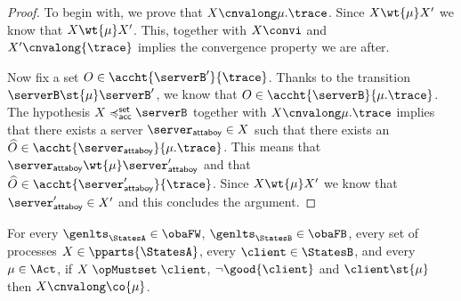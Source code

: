 \begin{proof}
      To begin with, we prove that $X \cnvalong \mu.\trace$.
      Since $X \wt{\mu} X'$ we know that $ X \wt{ \mu } X'$.
      This, together with $X \convi$ and $X' \cnvalong{ \trace} $
      implies the convergence property we are after.

      Now fix a set $ O \in \accht{ \serverB' }{ \trace }$.
      Thanks to the transition $ \serverB \st{ \mu } \serverB'$,
      we know that $ O \in \accht{ \serverB }{ \mu.\trace }$.
      The hypothesis $ X \accleqset \serverB $ together with
      $ X \cnvalong \mu.\trace$ implies that there exists
      a server $\attaboy \in X$ such that there exists an
      $ \widehat{O} \in \accht{ \attaboy }{ \mu.\trace }$.
      This means that $ \attaboy \wt{ \mu } \attaboy'$ and that
      $ \widehat{O} \in \accht{ \attaboy' }{ \trace } $.
      Since $X \wt{\mu} X'$ we know that $\attaboy' \in X' $
      and this concludes the argument.


  \end{proof}


\begin{lemma}
  \label{lem:ungood-cnv-mu}
  For every $\genlts_\StatesA \in \obaFW$, $\genlts_\StatesB \in \obaFB$,
  every set of processes $X \in \pparts{ \StatesA }$, every $\client \in \StatesB$, and every $\mu \in \Act$,
  if $\mustset{X}{\client}$, $\lnot \good{\client}$ and $\client \st{\mu}$ then $X \cnvalong \co{\mu}$.
\end{lemma}

